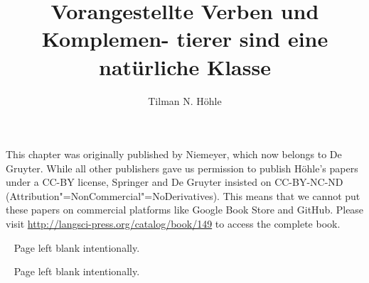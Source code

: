 \documentclass[output=paper]{langscibook}
\author{Tilman N. Höhle}
\title{Vorangestellte Verben und Komplemen- tierer sind eine natürliche\newlineTOC{} Klasse}
\begin{document}
\label{chap-komplementierer}


\noindent
This chapter was originally published by Niemeyer, which now belongs to De Gruyter. While all other publishers gave us permission to publish Höhle's papers under a CC-BY
license, Springer and De Gruyter insisted on CC-BY-NC-ND (Attribution"=NonCommercial"=No\-De\-riv\-a\-tives).
This means that we cannot put these papers on commercial platforms like Google Book Store and GitHub. Please
visit \url{http://langsci-press.org/catalog/book/149} to access the complete book.


\pagebreak~
Page left blank intentionally.

\pagebreak~
Page left blank intentionally.

\setcounter{page}{433}

\label{chap-komplementierer-end}
\pagebreak~
\end{document}
